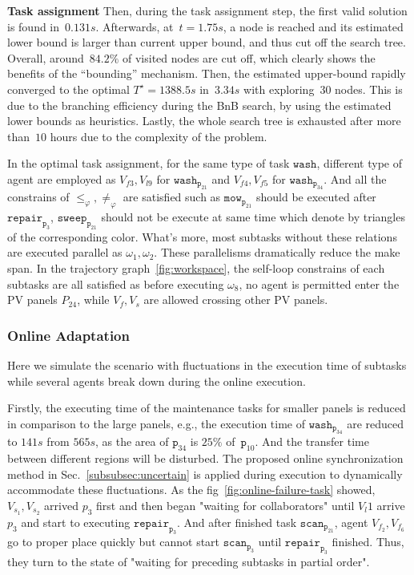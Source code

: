  
\textbf{Task assignment}
Then, during the task assignment step,
the first valid solution is found in~$0.131s$.
Afterwards, at~$t=1.75s$, a node is reached and its estimated lower
bound is larger than current upper bound, and thus cut off the search tree.
Overall, around~$84.2\%$ of visited nodes are cut off,
which clearly shows the benefits of the ``bounding'' mechanism.
Then, the estimated upper-bound rapidly converged
to the optimal $T^\star=1388.5s$ in~$3.34s$ with exploring~$30$ nodes.
This is due to the branching efficiency during the BnB search,
by using the estimated lower bounds as heuristics.
Lastly, the whole search tree is exhausted after more than~$10$ hours
due to the complexity of the problem. 


In the optimal task assignment, for the same type of task $\texttt{wash}$,
different type of agent are employed as $V_{f3},V_{l9}$ for $\texttt{wash}_{\texttt{p}_{21}}$ and
 $V_{f4},V_{f5}$ for $\texttt{wash}_{\texttt{p}_{34}}$. And all the constrains 
 of $\leq_\varphi,\neq_\varphi$ are satisfied such as $\texttt{mow}_{\texttt{p}_{21}}$ 
should be executed after $\texttt{repair}_{\texttt{p}_3}$, $\texttt{sweep}_{\texttt{p}_21}$
should not be execute at same time which denote by triangles of the corresponding color.
What's more, most subtasks without these relations are executed parallel as $\omega_1,\omega_2$.
These parallelisms dramatically reduce the make span.
In the trajectory graph~\ref{fig:workspace}, the self-loop constrains of each subtasks are all satisfied
as before executing $\omega_8$, no agent is permitted enter the PV panels $P_{24}$, while $V_f, V_s$ are allowed 
crossing other PV panels.


 

\subsubsection{Online Adaptation}\label{subsubsec:exp-adapt}
Here we simulate the scenario with fluctuations in the execution time of subtasks while
several agents break down during the online execution. 


Firstly, the executing time of the maintenance tasks for smaller panels
is reduced in comparison to the large panels, e.g., the execution time
of $\texttt{wash}_{\texttt{p}_{34}}$ are reduced to $141s$ from $565s$, as the area
of $\texttt{p}_{34}$ is $25\%$ of~$\texttt{p}_{10}$. And the transfer time 
between different regions will be disturbed. The proposed online synchronization method in
 Sec.~\ref{subsubsec:uncertain} is applied during execution to dynamically accommodate these fluctuations.
As the fig~\ref{fig:online-failure-task} showed, $V_{s_1}, V_{s_2}$ arrived $p_3$ first
and then began "waiting for collaborators" until $V_l1$ arrive $p_3$ and start to executing
  $\texttt{repair}_{\texttt{p}_3}$. And after finished task $\texttt{scan}_{\texttt{p}_{21}}$,
  agent $V_{f_2},V_{f_6}$ go to proper place quickly but cannot start $\texttt{scan}_{\texttt{p}_3}$
  until $\texttt{repair}_{\texttt{p}_3}$ finished. Thus, they turn to the state of "waiting for preceding subtasks
  in partial order".



